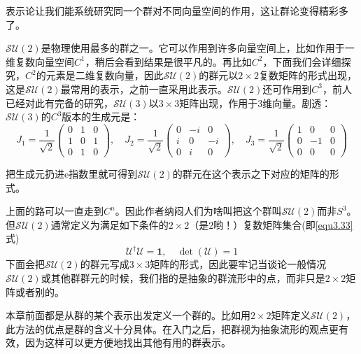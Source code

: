 表示论让我们能系统研究同一个群对不同向量空间的作用，这让群论变得精彩多了。

$\mathcal{SU}(2)$是物理使用最多的群之一。它可以作用到许多向量空间上，比如作用于一维复数向量空间$C^1$，稍后会看到结果是很平凡的。再比如$C^2$，下面我们会详细探究，$C^2$的元素是二维复数向量，因此$\mathcal{SU}(2)$的群元以$2 \times 2$复数矩阵的形式出现，这是$\mathcal{SU}(2)$最常用的表示，之前一直采用此表示。$\mathcal{SU}(2)$还可作用到$C^3$，前人已经对此有完备的研究，$\mathcal{SU}(3)$以$3 \times 3$矩阵出现，作用于$3$维向量。剧透：$\mathcal{SU}(3)$的$C^3$版本的生成元是：
\begin{equation}
\label{equ3.87}
J_1 = \frac{1}{\sqrt{2}}
	\begin{pmatrix}
		0 & 1 & 0 \\
		1 & 0 & 1 \\
		0 & 1 & 0
	\end{pmatrix}
, \quad
J_2 = \frac{1}{\sqrt{2}}
	\begin{pmatrix}
		0 & -i & 0 \\
		i & 0 & -i \\
		0 & i & 0
	\end{pmatrix}
, \quad
J_3 = \frac{1}{\sqrt{2}}
	\begin{pmatrix}
		1 & 0 & 0 \\
		0 & -1 & 0 \\
		0 & 0 & 0
	\end{pmatrix}
\end{equation}

把生成元扔进$\mathrm{e}$指数里就可得到$\mathcal{SU}(2)$的群元在这个表示之下对应的矩阵的形式。

上面的路可以一直走到$C^n$。因此作者纳闷人们为啥叫把这个群叫$\mathcal{SU}(2)$而非$S^3$。但$\mathcal{SU}(2)$通常定义为满足如下条件的$2 \times 2$（是$2$哟！）复数矩阵集合(即\ref{equ3.33}式)
\begin{equation}
\label{equ3.88}
\mathcal{U}^\dag \mathcal{U} = \mathbf{1}, \quad \det (\mathcal{U}) = 1
\end{equation}
下面会把$\mathcal{SU}(2)$的群元写成$3 \times 3$矩阵的形式，因此要牢记当谈论一般情况$\mathcal{SU}(2)$或其他群群元的时候，我们指的是抽象的群流形中的点，而非只是$2 \times 2$矩阵或者别的。

本章前面都是从群的某个表示出发定义一个群的。比如用$2 \times 2$矩阵定义$\mathcal{SU}(2)$，此方法的优点是群的含义十分具体。在入门之后，把群视为抽象流形的观点更有效，因为这样可以更方便地找出其他有用的群表示。

